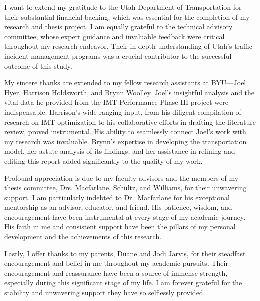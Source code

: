 \documentclass[fancy, oneside, mastersfancy, ms]{byuthesis}
\begin{document}
\begin{acknowledgments}
I want to extend my gratitude to the Utah Department of Transportation
for their substantial financial backing, which was essential for the
completion of my research and thesis project. I am equally grateful to
the technical advisory committee, whose expert guidance and invaluable
feedback were critical throughout my research endeavor. Their in-depth
understanding of Utah's traffic incident management programs was a
crucial contributor to the successful outcome of this study.

My sincere thanks are extended to my fellow research assistants at
BYU---Joel Hyer, Harrison Holdsworth, and Brynn Woolley. Joel's
insightful analysis and the vital data he provided from the IMT
Performance Phase III project were indispensable. Harrison's
wide-ranging input, from his diligent compilation of research on IMT
optimization to his collaborative efforts in drafting the literature
review, proved instrumental. His ability to seamlessly connect Joel's
work with my research was invaluable. Brynn's expertise in developing
the transportation model, her astute analysis of its findings, and her
assistance in refining and editing this report added significantly to
the quality of my work.

Profound appreciation is due to my faculty advisors and the members of
my thesis committee, Drs. Macfarlane, Schultz, and Williams, for their
unwavering support. I am particularly indebted to Dr.~Macfarlane for his
exceptional mentorship as an advisor, educator, and friend. His
patience, wisdom, and encouragement have been instrumental at every
stage of my academic journey. His faith in me and consistent support
have been the pillars of my personal development and the achievements of
this research.

Lastly, I offer thanks to my parents, Duane and Jodi Jarvis, for their
steadfast encouragement and belief in me throughout my academic
pursuits. Their encouragement and reassurance have been a source of
immense strength, especially during this significant stage of my life. I
am forever grateful for the stability and unwavering support they have
so selflessly provided.
\end{acknowledgments}
\cleardoublepage

	\tableofcontents*
	\cleardoublepage

	\listoffigures
	\cleardoublepage

	\listoftables
	\cleardoublepage

\mainmatter
{}
\end{document}
